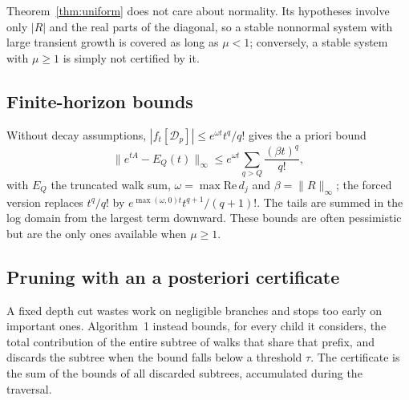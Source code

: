 Theorem~\ref{thm:uniform} does not care about normality. Its hypotheses involve only $|R|$ and the real parts of the diagonal, so a stable nonnormal system with large transient growth is covered as long as $\mu<1$; conversely, a stable system with $\mu\ge1$ is simply not certified by it.

\subsection{Finite-horizon bounds}
Without decay assumptions, $|f_t[\mathcal{D}_p]|\le e^{\omega t}t^q/q!$ gives the a priori bound
\begin{equation}\label{eq:horizon}
\|e^{tA}-E_Q(t)\|_\infty\le e^{\omega t}\sum_{q>Q}\frac{(\beta t)^q}{q!},
\end{equation}
with $E_Q$ the truncated walk sum, $\omega=\max\mathrm{Re}\,d_j$ and $\beta=\|R\|_\infty$; the forced version replaces $t^q/q!$ by $e^{\max(\omega,0)t}t^{q+1}/(q+1)!$. The tails are summed in the log domain from the largest term downward. These bounds are often pessimistic but are the only ones available when $\mu\ge1$.

\subsection{Pruning with an a posteriori certificate}\label{sec:certificate}
A fixed depth cut wastes work on negligible branches and stops too early on important ones. Algorithm~1 instead bounds, for every child it considers, the total contribution of the entire subtree of walks that share that prefix, and discards the subtree when the bound falls below a threshold $\tau$. The certificate is the sum of the bounds of all discarded subtrees, accumulated during the traversal.

